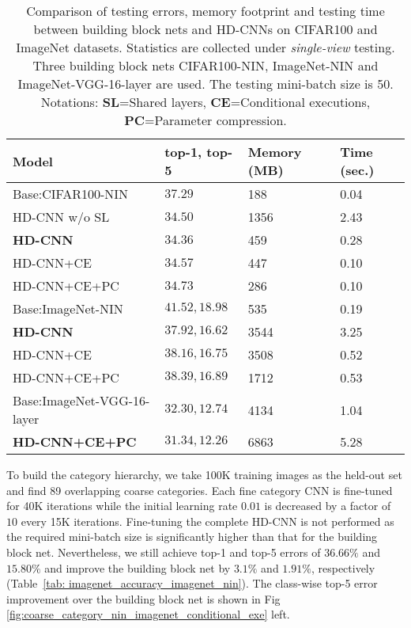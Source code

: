 \documentclass[10pt,twocolumn,letterpaper]{article}
\begin{document}
{\renewcommand{\arraystretch}{1.2}\begin{table}[ht]
\vspace{-1em}
\caption{Comparison of testing errors, memory footprint and testing time between building block nets and HD-CNNs on CIFAR100 and ImageNet datasets. Statistics are collected under \textit{single-view} testing. Three building block nets CIFAR100-NIN, ImageNet-NIN and ImageNet-VGG-16-layer are used. The testing mini-batch size is 50. Notations: \textbf{SL}=Shared layers, \textbf{CE}=Conditional executions, \textbf{PC}=Parameter compression.}
\label{tab: internal_comp} 
\vspace{-1em}
\begin{center}
    \begin{tabular}{  p{3.3cm} | p{2.0cm} | p{1.0cm} |p{0.6cm} }
    Model & top-1, top-5 & Memory (MB) & Time (sec.) \\ 
    \hline \hline
    Base:CIFAR100-NIN &  $37.29$ &  188 & 0.04 \\ \hline  
    HD-CNN w/o SL &  $34.50$ &  1356  & 2.43 \\ \hline     
    \textbf{HD-CNN} &  $\mathbf{34.36}$ &  459  & 0.28 \\ \hline     
    HD-CNN+CE &  $34.57$ &  447  & 0.10 \\ \hline 
    HD-CNN+CE+PC &  $34.73$ &  286  & 0.10 \\ \hline
    \hline
    Base:ImageNet-NIN &  $41.52,18.98$ &  535 & 0.19 \\ \hline       
	\textbf{HD-CNN} &  $\mathbf{37.92},\mathbf{16.62}$ &  3544 & 3.25 \\ \hline    
    HD-CNN+CE&  $38.16,16.75$ &  3508 & 0.52 \\ \hline    
    HD-CNN+CE+PC&  $38.39,16.89$ &  1712 & 0.53 \\ \hline
    \hline 
    Base:ImageNet-VGG-16-layer &  $32.30,12.74$ & 4134 & 1.04 \\ \hline 
    \textbf{HD-CNN+CE+PC}&  $\mathbf{31.34},\mathbf{12.26}$ &  6863 & 5.28 \\ \hline 
    \end{tabular}   
\end{center}
\vspace{-0.5em}
\end{table}
}

To build the category hierarchy, we take 100K training images as the held-out set and find 89 overlapping coarse categories. 
Each fine category CNN is fine-tuned for 40K iterations while the initial learning rate $0.01$ is decreased by a factor of $10$ every 15K iterations. Fine-tuning the complete HD-CNN is not performed as the required mini-batch size is significantly higher than that for the building block net. Nevertheless, we still achieve top-1 and top-5 errors of $36.66\%$ and $15.80\%$ and improve the building block net by $3.1\%$ and $1.91\%$, respectively (Table~\ref{tab: imagenet_accuracy_imagenet_nin}). The class-wise top-5 error improvement over the building block net is shown in Fig \ref{fig:coarse_category_nin_imagenet_conditional_exe} left.
\end{document}
